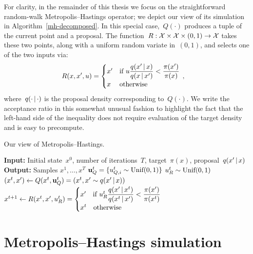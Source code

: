 \documentclass[angelino.tex]{subfiles}
\begin{document}
For clarity, in the remainder of this thesis we focus on the
straightforward random-walk Metropolis--Hastings operator;
we depict our view of its simulation in Algorithm~\ref{mh-decomposed}.
In this special case,~$Q(\cdot)$ produces a tuple of the current point and a 
proposal.
The function~${R:{\mathcal X}\times{\mathcal X}\times(0,1)\to{\mathcal X}}$ takes these two points, along with a uniform random variate in~$(0,1)$, and selects one of the two inputs via:
\begin{align}
R(x,x',u) &= \begin{cases}
 x' & \text{if } u\dfrac{q(x' \,|\, x)}{q(x \,|\, x')} < \dfrac{\pi(x')}{\pi(x)}\\
 x & \text{otherwise}
 \end{cases}\,,
 \label{eqn:mh-threshold}
\end{align}
where~$q(\cdot\,|\,\cdot)$ is the proposal density corresponding to~$Q(\cdot)$.  We write the acceptance ratio in this somewhat unusual fashion to highlight the fact that the left-hand side of the inequality does not require evaluation of the target density and is easy to precompute.

\begin{algorithm}[t]
\caption{Our view of Metropolis--Hastings.}
\label{mh-decomposed}
\begin{algorithmic}
\State \textbf{Input:} Initial state~$x^0$, number of iterations~$T$, target~$\pi(x)$, proposal~$q(x' \,|\, x)$
\State \textbf{Output:} Samples $x^1, \dots, x^T$
\vspace{1mm}
\State $\mathbf{u}_Q^t = \{u_{Q,i}^t \sim \mbox{Unif}(0, 1)\}$
\vspace{1mm}
\State $u_R^t \sim \mbox{Unif}(0, 1)$
\vspace{1mm}
\State $(x^t, x') \gets Q(x^t, \mathbf{u}_Q^t) = (x^t, x' \sim q(x' \,|\, x))$
\vspace{1mm}
\State $x^{t+1} \gets R(x^t, x', u_R^t) = 
\begin{cases}
x' \quad \text{if}~u_R^t \dfrac{q(x' \,|\, x^t)}{q(x^t \,|\, x')} < \dfrac{\pi(x')}{\pi(x^t)} \\
x^t \quad \text{otherwise}
\end{cases}$
\EndFor
\end{algorithmic}
\end{algorithm}

\section{Metropolis--Hastings simulation}
\end{document}
